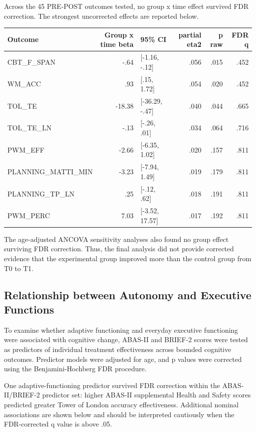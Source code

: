 \documentclass[
  letterpaper,
  DIV=11,
  numbers=noendperiod]{scrartcl}
\newcounter{none} %
\begin{document}
Across the 45 PRE-POST outcomes tested, no group x time effect survived
FDR correction. The strongest uncorrected effects are reported below.

{\def\LTcaptype{none} %
\begin{longtable}[]{@{}lrlrrr@{}}
\toprule\noalign{}
Outcome & Group x time beta & 95\% CI & partial eta2 & p raw & FDR q \\
\midrule\noalign{}
\endhead
\bottomrule\noalign{}
\endlastfoot
CBT\_F\_SPAN & -.64 & {[}-1.16, -.12{]} & .056 & .015 & .452 \\
WM\_ACC & .93 & {[}.15, 1.72{]} & .054 & .020 & .452 \\
TOL\_TE & -18.38 & {[}-36.29, -.47{]} & .040 & .044 & .665 \\
TOL\_TE\_LN & -.13 & {[}-.26, .01{]} & .034 & .064 & .716 \\
PWM\_EFF & -2.66 & {[}-6.35, 1.02{]} & .020 & .157 & .811 \\
PLANNING\_MATTI\_MIN & -3.23 & {[}-7.94, 1.49{]} & .019 & .179 & .811 \\
PLANNING\_TP\_LN & .25 & {[}-.12, .62{]} & .018 & .191 & .811 \\
PWM\_PERC & 7.03 & {[}-3.52, 17.57{]} & .017 & .192 & .811 \\
\end{longtable}
}

The age-adjusted ANCOVA sensitivity analyses also found no group effect
surviving FDR correction. Thus, the final analysis did not provide
corrected evidence that the experimental group improved more than the
control group from T0 to T1.

\subsection{Relationship between Autonomy and Executive
Functions}\label{relationship-between-autonomy-and-executive-functions}

To examine whether adaptive functioning and everyday executive
functioning were associated with cognitive change, ABAS-II and BRIEF-2
scores were tested as predictors of individual treatment effectiveness
across bounded cognitive outcomes. Predictor models were adjusted for
age, and p values were corrected using the Benjamini-Hochberg FDR
procedure.

One adaptive-functioning predictor survived FDR correction within the
ABAS-II/BRIEF-2 predictor set: higher ABAS-II supplemental Health and
Safety scores predicted greater Tower of London accuracy effectiveness.
Additional nominal associations are shown below and should be
interpreted cautiously when the FDR-corrected q value is above .05.
\end{document}
